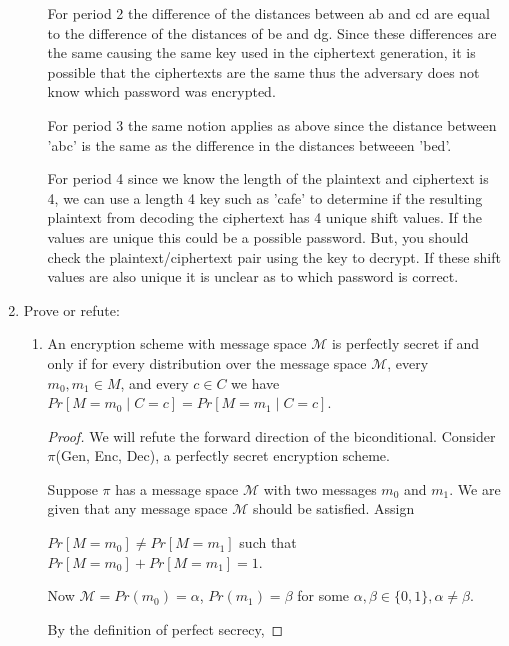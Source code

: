 \documentclass{article}
\begin{document}
\begin{enumerate}
\begin{enumerate}
        For period 2 the difference of the distances between ab and cd are equal to the difference of the distances of be and dg. Since these differences are the same causing the same key used in the ciphertext generation,  it is possible that the ciphertexts are the same thus the adversary does not know which password was encrypted. 

       
        For period 3 the same notion applies as above since the distance between 'abc' is the same as the difference in the distances betweeen 'bed'.


        For period 4 since we know the length of the plaintext and ciphertext is 4, we can use a length 4 key such as 'cafe' to determine if the resulting plaintext from decoding the ciphertext has 4 unique shift values. If the values are unique this could be a possible password. But, you should check the plaintext/ciphertext pair using the key to decrypt. If these shift values are also unique it is unclear as to which password is correct. 
    \end{enumerate}
  \item Prove or refute:
    \begin{enumerate}
      \item An encryption scheme with message space $\mathcal{M}$ is perfectly
        secret if and only if for every distribution over the message space 
        $\mathcal{M}$, every $m_0, m_1 \in M$, and every $c \in C$ we have 
        $Pr\left[M = m_0 \mid C = c\right] = Pr\left[M = m_1 \mid C = c\right]$.

        \begin{proof}
        We will refute the forward direction of the biconditional. Consider $\pi$(Gen, Enc, Dec), a perfectly secret encryption scheme. \newline

        Suppose $\pi$ has a message space $\mathcal{M}$ with two messages $m_0$ and $m_1$. We are given that any message space $\mathcal{M}$ should be satisfied. Assign
        
        $Pr[M = m_0] \neq Pr[M = m_1]$ such that $Pr[M = m_0] + Pr[M = m_1] = 1$.\newline

        Now $\mathcal{M} = 
        Pr(m_0) = \alpha$,
        $Pr(m_1) = \beta$ 
        for some $\alpha, \beta \in \{0, 1\}, \alpha \neq \beta$. \newline

        By the definition of perfect secrecy,


\end{proof}
\end{enumerate}
\end{enumerate}
\end{document}
